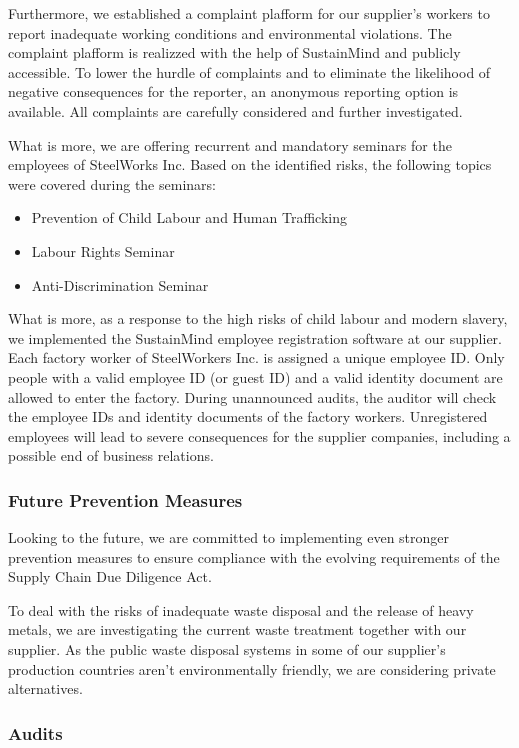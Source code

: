 \documentclass{article}
\begin{document}
Furthermore, we established a complaint plafform for our supplier's workers to report inadequate working conditions and environmental violations. The complaint plafform
is realizzed with the help of SustainMind and publicly accessible. To lower the hurdle of complaints and to eliminate the likelihood of negative consequences for the reporter,
an anonymous reporting option is available. All complaints are carefully considered and further investigated.

What is more, we are offering recurrent and mandatory seminars for the employees of SteelWorks Inc. Based on the identified risks, the following topics were covered during
the seminars:
\begin{itemize}
    \item Prevention of Child Labour and Human Trafficking
    \item Labour Rights Seminar
    \item Anti-Discrimination Seminar
\end{itemize}

What is more, as a response to the high risks of child labour and modern slavery, we implemented the SustainMind employee registration software at our supplier.
Each factory worker of SteelWorkers Inc. is assigned a unique employee ID. Only people with a valid employee ID (or guest ID) and a valid identity document are
allowed to enter the factory. During unannounced audits, the auditor will check the employee IDs and identity documents of the factory workers. Unregistered employees
will lead to severe consequences for the supplier companies, including a possible end of business relations.

\subsubsection*{Future Prevention Measures}

Looking to the future, we are committed to implementing even stronger prevention measures to ensure compliance with the evolving requirements of the Supply Chain
Due Diligence Act.

To deal with the risks of inadequate waste disposal and the release of heavy metals, we are investigating the current waste treatment together with our supplier.
As the public waste disposal systems in some of our supplier's production countries aren't environmentally friendly, we are considering private alternatives.

\subsubsection*{Audits}
\end{document}

